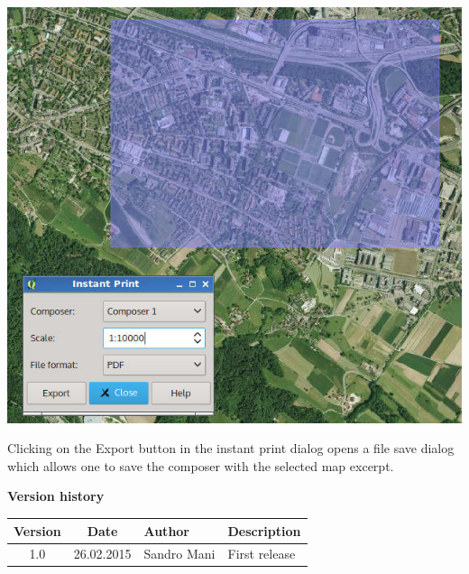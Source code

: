 \documentclass[11pt,twoside,a4paper]{report}
\begin{document}
\begin{center}
 \includegraphics[width=.5\textwidth]{img/screenshot.jpg}
\end{center}


Clicking on the Export button in the instant print dialog opens a file save dialog which allows one to save the composer with the selected map excerpt.

\newpage
{\Large{\textbf{Version history}}}
{\small{
\begin{center}
\begin{tabularx}{\textwidth}{|c|c|l|X|}
 \hline
 \textbf{Version} & \textbf{Date} & \textbf{Author} & \textbf{Description} \\\hline
 1.0   & 26.02.2015 & Sandro Mani & First release \\\hline
 \end{tabularx}
\end{center}
}}
\end{document}
